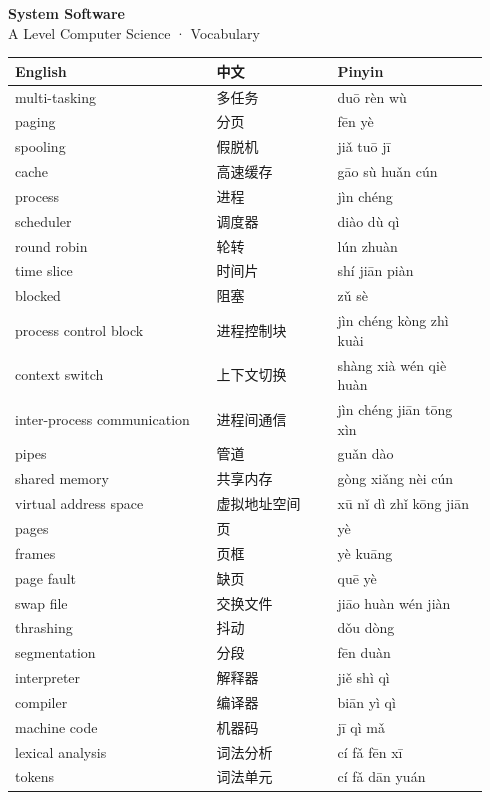 \documentclass[11pt]{article}
\begin{document}
\begin{center}
  {\LARGE\bfseries System Software}\\[0.35em]
  {\large A Level Computer Science · Vocabulary}
\end{center}
\vspace{0.6em}

\begin{longtable}{@{}p{0.40\linewidth}p{0.24\linewidth}p{0.30\linewidth}@{}}
\toprule
\textbf{English} & \textbf{中文} & \textbf{Pinyin} \\
\midrule
\endhead
\bottomrule
\endlastfoot
multi-tasking & 多任务 & duō rèn wù \\
paging & 分页 & fēn yè \\
spooling & 假脱机 & jiǎ tuō jī \\
cache & 高速缓存 & gāo sù huǎn cún \\
process & 进程 & jìn chéng \\
scheduler & 调度器 & diào dù qì \\
round robin & 轮转 & lún zhuàn \\
time slice & 时间片 & shí jiān piàn \\
blocked & 阻塞 & zǔ sè \\
process control block & 进程控制块 & jìn chéng kòng zhì kuài \\
context switch & 上下文切换 & shàng xià wén qiè huàn \\
inter-process communication & 进程间通信 & jìn chéng jiān tōng xìn \\
pipes & 管道 & guǎn dào \\
shared memory & 共享内存 & gòng xiǎng nèi cún \\
virtual address space & 虚拟地址空间 & xū nǐ dì zhǐ kōng jiān \\
pages & 页 & yè \\
frames & 页框 & yè kuāng \\
page fault & 缺页 & quē yè \\
swap file & 交换文件 & jiāo huàn wén jiàn \\
thrashing & 抖动 & dǒu dòng \\
segmentation & 分段 & fēn duàn \\
interpreter & 解释器 & jiě shì qì \\
compiler & 编译器 & biān yì qì \\
machine code & 机器码 & jī qì mǎ \\
lexical analysis & 词法分析 & cí fǎ fēn xī \\
tokens & 词法单元 & cí fǎ dān yuán \\

\end{longtable}
\end{document}

